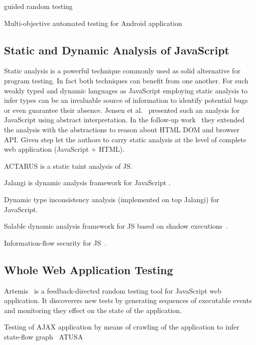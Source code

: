 \documentclass[sigconf,review,anonymous]{acmart}
\begin{document}
\cite{ma2015grt} guided random testing

\cite{mao2016sapienz} Multi-objective automated testing for Android application

\subsection{Static and Dynamic Analysis of JavaScript}
\label{sub.sec.js.static.anal}

Static analysis is a powerful technique commonly used as solid alternative for program testing. In fact both techniques can benefit from one another. For such weakly typed and dynamic languages as JavaScript employing static analysis to infer types can be an invaluable source of information to identify potential bugs or even guarantee their absence. Jensen et al.~\cite{tajs2009} presented such an analysis for JavaScript using abstract interpretation. In the follow-up work~\cite{dom2011} they extended the analysis with the abstractions to reason about HTML DOM and browser API. Given step let the authors to carry static analysis at the level of complete web application (JavaScript + HTML).
\cite{jquery2014}


ACTARUS is a static taint analysis of JS\cite{guarnieri2011saving}.

Jalangi is dynamic analysis framework for JavaScript \cite{sen2013jalangi}.

Dynamic type inconsistency analysis (implemented on top Jalangi) for JavaScript\cite{pradel2015typedevil}.

Salable dynamic analysis framework for JS based on shadow executions~\cite{create.citation}.

Information-flow security for JS~\cite{hedin2012information}.

\subsection{Whole Web Application Testing}
\label{sub.sec.web.app.test}

Artemis~\cite{artemis2011} is a feedback-directed random testing tool for JavaScript web application. It discoverers new tests by generating sequences of executable events and monitoring they effect on the state of the application. \cite{ail2013}

Testing of AJAX application by means of crawling of the application to infer state-flow graph~\cite{mesbah2012crawling} ATUSA ~\cite{mesbah2012invariant}
\end{document}
